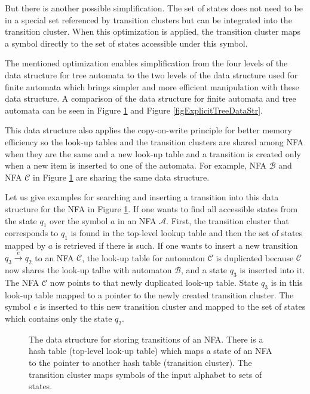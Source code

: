 But there is another possible simplification. The set of states does not need to be in a special set referenced by transition clusters but can be integrated
into the transition cluster. When this optimization is applied, the transition cluster maps a symbol directly to the set of states accessible under this symbol.

The mentioned optimization enables simplification from the four levels of the data structure for tree automata to the two levels of the
data structure used for finite automata which 
brings simpler and more efficient manipulation with these data structure. A comparison of the data structure for finite automata and 
tree automata can be seen in Figure \ref{figExplicitFADataStr} and Figure \ref{figExplicitTreeDataStr}.

This data structure also applies the copy-on-write principle for better memory efficiency so the look-up tables and 
the transition clusters are shared among NFA when they are the same and
a new look-up table and a transition is created only when a new item is inserted to one of the automata. For example, NFA $\mathcal{B}$ and NFA $\mathcal{C}$
in Figure \ref{figExplicitFADataStr} are sharing the same data structure.

Let us give examples for searching and inserting a transition into this data structure for the NFA in Figure \ref{figExplicitFADataStr}. 
If one wants to find all accessible states from the state $q_1$ over the symbol $a$ in an NFA $\mathcal{A}$.
First, the transition cluster that corresponds to $q_1$ is found in the top-level lookup table and then the set of states mapped by $a$ is retrieved if there
is such.
If one wants to insert a new transition $q_3 \xrightarrow{e} q_2$ to an NFA $\mathcal{C}$, the look-up table for automaton $\mathcal{C}$ is duplicated
because $\mathcal{C}$ now shares the look-up talbe with automaton $\mathcal{B}$,
and a state $q_3$ is inserted into it. The NFA $\mathcal{C}$ now points to that newly duplicated look-up table. State $q_3$ is in this look-up table 
mapped to a pointer to the newly created transition cluster. 
The symbol $e$ is inserted to this new transition cluster and mapped to the set of states which contains only the state $q_2$.

\begin{figure}[bt]
\begin{center}

    \caption{The data structure for storing transitions of an NFA. There is a hash table (top-level look-up table) 
      which maps a state of an NFA to the pointer to another hash table (transition cluster). The transition cluster maps symbols of the input alphabet
      to sets of states.}
		\label{figExplicitFADataStr}
\end{center}
\end{figure}

